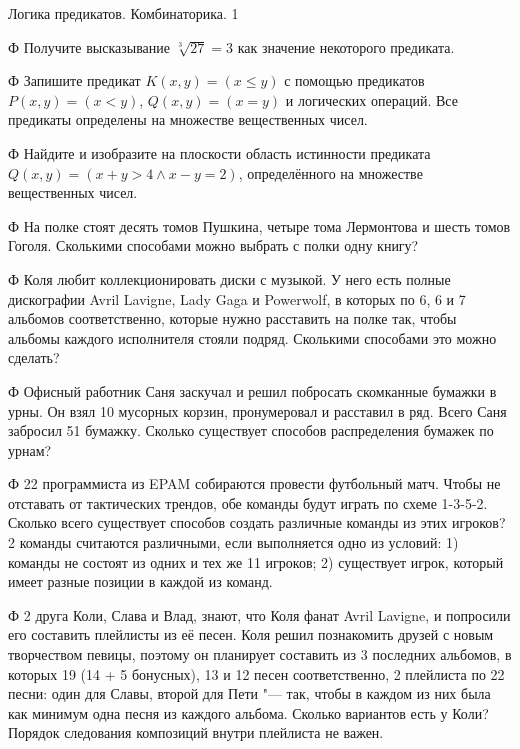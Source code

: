 



{Логика предикатов. Комбинаторика.}
{1}

\begin{problemList}

\problemItemSimple
{Ф}
{Получите высказывание $\sqrt[3]{27} = 3$ как значение некоторого предиката.}

\problemItemSimple
{Ф}
{Запишите предикат $K(x, y) = (x \leq y)$ с помощью предикатов $P(x, y) = (x < y)$, $Q(x, y) = (x = y)$ и логических операций. Все предикаты определены на множестве вещественных чисел.}

\problemItemSimple
{Ф}
{Найдите и изобразите на плоскости область истинности предиката $Q(x, y) = (x + y > 4 \wedge x - y = 2)$, определённого на множестве вещественных чисел.}

\problemItemSimple
{Ф}
{На полке стоят десять томов Пушкина, четыре тома Лермонтова и шесть томов Гоголя. Сколькими способами можно выбрать с полки одну книгу?}

\problemItemSimple
{Ф}
{Коля любит коллекционировать диски с музыкой. У него есть полные дискографии Avril Lavigne, Lady Gaga и Powerwolf, в которых по 6, 6 и 7 альбомов соответственно, которые нужно расставить на полке так, чтобы альбомы каждого исполнителя стояли подряд. Сколькими способами это можно сделать?}

\problemItemSimple
{Ф}
{Офисный работник Саня заскучал и решил побросать скомканные бумажки в урны. Он взял 10 мусорных корзин, пронумеровал и расставил в ряд. Всего Саня забросил 51 бумажку. Сколько существует способов распределения бумажек по урнам?}

\problemItemSimple
{Ф}
{22 программиста из EPAM собираются провести футбольный матч. Чтобы не отставать от тактических трендов, обе команды будут играть по схеме 1-3-5-2. Сколько всего существует способов создать различные команды из этих игроков? 2 команды считаются различными, если выполняется одно из условий: 1) команды не состоят из одних и тех же 11 игроков; 2) существует игрок, который имеет разные позиции в каждой из команд.}

\problemItemSimple
{Ф}
{2 друга Коли, Слава и Влад, знают, что Коля фанат Avril Lavigne, и попросили его составить плейлисты из её песен. Коля решил познакомить друзей с новым творчеством певицы, поэтому он планирует составить из 3 последних альбомов, в которых 19 (14 + 5 бонусных), 13 и 12 песен соответственно, 2 плейлиста по 22 песни: один для Славы, второй для Пети "--- так, чтобы в каждом из них была как минимум одна песня из каждого альбома. Сколько вариантов есть у Коли? Порядок следования композиций внутри плейлиста не важен.}

\end{problemList}
    
